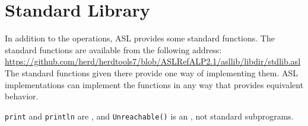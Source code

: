 \chapter{Standard Library\label{chap:StandardLibrary}}

In addition to the operations, ASL provides some standard functions.
The standard functions are available from the following address:
\url{https://github.com/herd/herdtools7/blob/ASLRefALP2.1/asllib/libdir/stdlib.asl}
The standard functions given there provide one way of implementing them.
ASL implementations can implement the functions in any way that provides equivalent behavior.

\verb|print| and \verb|println| are \printstatementsterm{},
and \verb|Unreachable()| is an \unreachablestatementterm{}, not standard subprograms.
